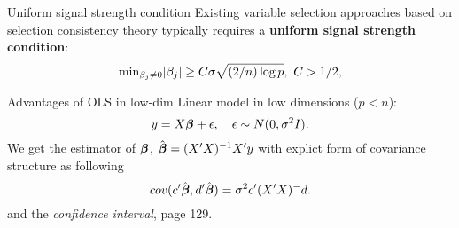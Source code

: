 \begin{frame}
\small

\begin{block}{Uniform signal strength condition}
  Existing variable selection approaches based on selection consistency theory typically requires a {\bf uniform signal strength condition}:
  \begin{equation}
  \label{ussc}
  \hbox{$\min_{\beta_j\neq 0}$} |\beta_j| \ge C\sigma\sqrt{(2/n)\log p},\ C>1/2,
  \end{equation}    
\end{block}

\end{frame}

\begin{frame}{Advantages of OLS in low-dim}
  Linear model in low dimensions ($p<n$): 
  \begin{equation*}
    y = X\mbox{\boldmath $\beta$} + \epsilon,\quad \epsilon \sim N(0, \sigma^2 I).
  \end{equation*}
  We get the estimator of $\mbox{\boldmath $\beta$}$, $\hat{\mbox{\boldmath $\beta$}} = (X'X)^{-1} X' y$ with explict form of covariance structure as following
  \begin{equation*}
    cov(c' \hat{\mbox{\boldmath $\beta$}}, d' \hat{\mbox{\boldmath $\beta$}}) = \sigma^2 c' (X'X)^- d .
  \end{equation*}
  and the \emph{confidence interval}, page 129. 
\end{frame}